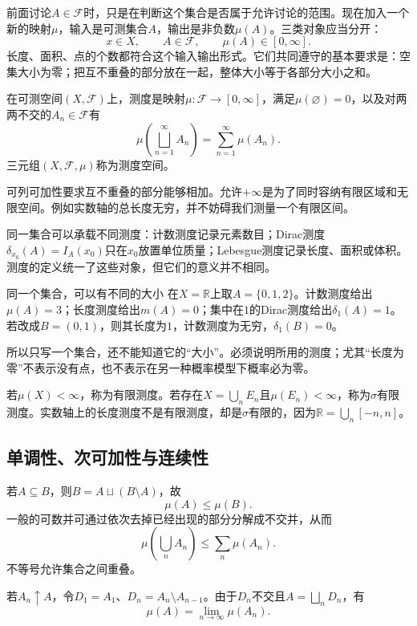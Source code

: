 前面讨论$A\in\mathcal F$时，只是在判断这个集合是否属于允许讨论的范围。现在加入一个新的映射$\mu$，输入是可测集合$A$，输出是非负数$\mu(A)$。三类对象应当分开：
\[
 x\in X,\qquad A\in\mathcal F,\qquad \mu(A)\in[0,\infty].
\]
长度、面积、点的个数都符合这个输入输出形式。它们共同遵守的基本要求是：空集大小为零；把互不重叠的部分放在一起，整体大小等于各部分大小之和。


\begin{definition}[测度]
在可测空间$(X,\mathcal F)$上，测度是映射$\mu:\mathcal F\to[0,\infty]$，满足$\mu(\varnothing)=0$，以及对两两不交的$A_n\in\mathcal F$有
\[
 \mu\left(\bigsqcup_{n=1}^{\infty}A_n\right)
 =\sum_{n=1}^{\infty}\mu(A_n).
\]
三元组$(X,\mathcal F,\mu)$称为测度空间。
\end{definition}

可列可加性要求互不重叠的部分能够相加。允许$+\infty$是为了同时容纳有限区域和无限空间。例如实数轴的总长度无穷，并不妨碍我们测量一个有限区间。

同一集合可以承载不同测度：计数测度记录元素数目；Dirac测度$\delta_{x_0}(A)=I_A(x_0)$只在$x_0$放置单位质量；Lebesgue测度记录长度、面积或体积。测度的定义统一了这些对象，但它们的意义并不相同。


\begin{bookexample}{同一个集合，可以有不同的大小}
在$X=\mathbb R$上取$A=\{0,1,2\}$。计数测度给出$\mu(A)=3$；长度测度给出$m(A)=0$；集中在$1$的Dirac测度给出$\delta_1(A)=1$。若改成$B=(0,1)$，则其长度为$1$，计数测度为无穷，$\delta_1(B)=0$。

所以只写一个集合，还不能知道它的“大小”。必须说明所用的测度；尤其“长度为零”不表示没有点，也不表示在另一种概率模型下概率必为零。
\end{bookexample}

若$\mu(X)<\infty$，称为有限测度。若存在$X=\bigcup_nE_n$且$\mu(E_n)<\infty$，称为$\sigma$有限测度。实数轴上的长度测度不是有限测度，却是$\sigma$有限的，因为$\mathbb R=\bigcup_n[-n,n]$。

\subsection{单调性、次可加性与连续性}

若$A\subseteq B$，则$B=A\sqcup(B\setminus A)$，故
\[
 \mu(A)\leq\mu(B).
\]
一般的可数并可通过依次去掉已经出现的部分分解成不交并，从而
\[
 \mu\left(\bigcup_nA_n\right)\leq\sum_n\mu(A_n).
\]
不等号允许集合之间重叠。

若$A_n\uparrow A$，令$D_1=A_1$、$D_n=A_n\setminus A_{n-1}$。由于$D_n$不交且$A=\bigsqcup_nD_n$，有
\[
 \mu(A)=\lim_{n\to\infty}\mu(A_n).
\]

